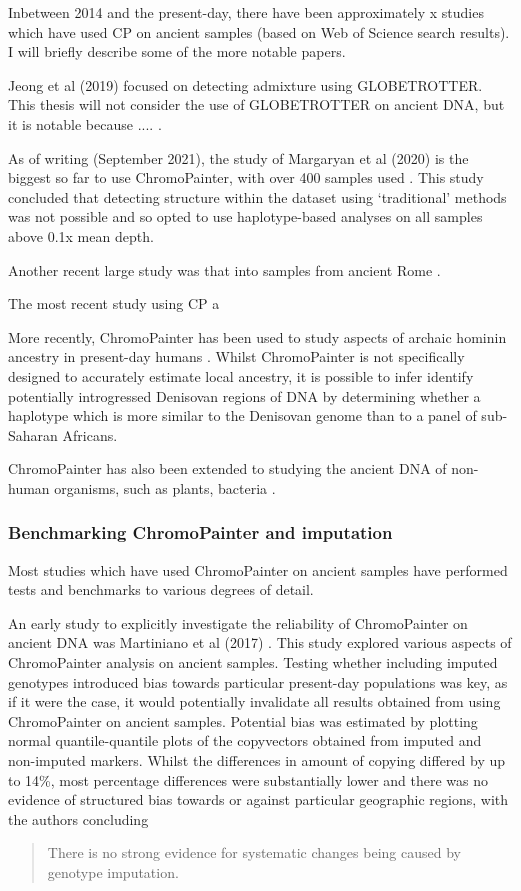 Inbetween 2014 and the present-day, there have been approximately x studies which have used CP on ancient samples (based on Web of Science search results). I will briefly describe some of the more notable papers.

Jeong et al (2019) focused on detecting admixture using GLOBETROTTER. This thesis will not consider the use of GLOBETROTTER on ancient DNA, but it is notable because .... \cite{jeong2019genetic}. 

As of writing (September 2021), the study of Margaryan et al (2020) is the biggest so far to use ChromoPainter, with over 400 samples used \cite{margaryan2020population}. This study concluded that detecting structure within the dataset using `traditional' methods was not possible and so opted to use haplotype-based analyses on all samples above 0.1x mean depth. 

Another recent large study was that into samples from ancient Rome \cite{antonio2019ancient}.

The most recent study using CP a

More recently, ChromoPainter has been used to study aspects of archaic hominin ancestry in present-day humans \cite{JACOBS20191010, teixeira2021widespread}. Whilst ChromoPainter is not specifically designed to accurately estimate local ancestry, it is possible to infer identify potentially introgressed Denisovan regions of DNA by determining whether a haplotype which is more similar to the Denisovan genome than to a panel of sub-Saharan Africans.

ChromoPainter has also been extended to studying the ancient DNA of non-human organisms, such as plants, bacteria \cite{Moodleye2015523118}. 

\subsubsection{Benchmarking ChromoPainter and imputation}

Most studies which have used ChromoPainter on ancient samples have performed tests and benchmarks to various degrees of detail. 

An early study to explicitly investigate the reliability of ChromoPainter on ancient DNA was Martiniano et al (2017) \cite{Martiniano2017}. This study explored various aspects of ChromoPainter analysis on ancient samples. Testing whether including imputed genotypes introduced bias towards particular present-day populations was key, as if it were the case, it would potentially invalidate all results obtained from using ChromoPainter on ancient samples. Potential bias was estimated by plotting normal quantile-quantile plots of the copyvectors obtained from imputed and non-imputed markers. Whilst the differences in amount of copying differed by up to 14\%, most percentage differences were substantially lower and there was no evidence of structured bias towards or against particular geographic regions, with the authors concluding \blockquote{There is no strong evidence for systematic changes being caused by genotype imputation.}. 

